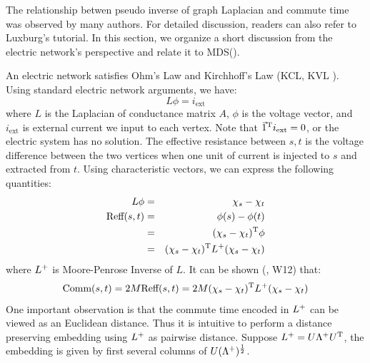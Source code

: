 The relationship betwen pseudo inverse of graph Laplacian 
and commute time was observed by many authors. For detailed
discussion, readers can also refer to Luxburg's tutorial\cite{von2007tutorial}. 
In this section, we organize a short discussion 
from the electric network's perspective 
and relate it to MDS(\rsec{\ref{sec:mds}}). 

An electric network satisfies Ohm's Law and Kirchhoff's Law
(KCL, KVL \cite{wiki_kcl_kvl}). Using standard electric network
arguments, we have:
\begin{equation}
	L \phi = i_{\text{ext}}
\end{equation}
where $ L $ is the Laplacian of conductance matrix $ A $, $ \phi $
is the voltage vector, and $ i_{\text{ext}} $ is external current 
we input to each vertex. Note that $ \vec{1}^\mathrm{T} i_{\text{ext}} = 0$, 
or the electric system has no solution. The effective resistance 
between $ s,t $ is the voltage difference between the two vertices when 
one unit of current is injected to $ s $ and extracted from $ t $. 
Using characteristic vectors, we can express the following quantities:
\begin{eqnarray}
	L \phi &=& \chi_s - \chi_t \\
	\text{Reff}(s,t) &=& \phi(s) - \phi(t) \nonumber \\
	&=& (\chi_s - \chi_t)^\mathrm{T}\phi \nonumber \\
	&=& (\chi_s - \chi_t)^\mathrm{T} L^{+} (\chi_s - \chi_t)
\end{eqnarray}
where $ L^{+} $ is Moore-Penrose Inverse\cite{wiki_mpinv} of $ L $. 
It can be shown (\cite{lau-2012-spectral-ln}, W12) that:
\begin{equation}
	\text{Comm}(s,t) = 2M\text{Reff}(s,t) 
	= 2M (\chi_s - \chi_t)^\mathrm{T} L^{+} (\chi_s - \chi_t)
\end{equation}
One important observation is that the commute time 
encoded in $  L^{+} $ can be viewed as an Euclidean 
distance. Thus it is intuitive to perform a distance preserving 
embedding using  $  L^{+} $ as pairwise distance. 
Suppose $ L^{+} = U \Lambda^{+} U^\mathrm{T}$, the embedding 
is given by first several columns of $  U (\Lambda^{+})^{\frac{1}{2}} $. 

